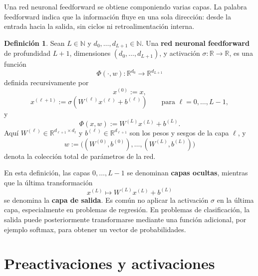 \documentclass[11pt]{report}
\newenvironment{tcolorbox}[1][]{\par\medskip\noindent\ignorespaces}{\par\medskip}
\theoremstyle{definition}
\newtheorem{definicion}{Definición}[section]
\theoremstyle{plain}
\numberwithin{equation}{section}
\begin{document}
Una red neuronal feedforward se obtiene componiendo varias capas. La palabra feedforward indica que la información fluye en una sola dirección: desde la entrada hacia la salida, sin ciclos ni retroalimentación interna.

\begin{tcolorbox}[colback=blue!8, colframe=blue!8, boxrule=0pt]
\begin{definicion}
Sean \(L\in\mathbb{N}\) y \(d_0,\ldots,d_{L+1}\in\mathbb{N}\). Una \textbf{red neuronal feedforward} de profundidad \(L+1\), dimensiones \((d_0,\ldots,d_{L+1})\), y activación \(\sigma:\mathbb{R}\to\mathbb{R}\), es una función
\begin{equation*}
    \Phi(\cdot,w):\mathbb{R}^{d_0}\to\mathbb{R}^{d_{L+1}}
\end{equation*}
definida recursivamente por
\begin{equation*}
    x^{(0)}:=x,
\end{equation*}
\begin{equation*}
    x^{(\ell+1)}
    :=
    \sigma(W^{(\ell)}x^{(\ell)}+b^{(\ell)})
    \qquad
    \text{para } \ell=0,\ldots,L-1,
\end{equation*}
y
\begin{equation*}
    \Phi(x,w)
    :=
    W^{(L)}x^{(L)}+b^{(L)}.
\end{equation*}
Aquí \(W^{(\ell)}\in\mathbb{R}^{d_{\ell+1}\times d_\ell}\) y \(b^{(\ell)}\in\mathbb{R}^{d_{\ell+1}}\) son los pesos y sesgos de la capa \(\ell\), y
\begin{equation*}
    w
    :=
    \bigl((W^{(0)},b^{(0)}),\ldots,(W^{(L)},b^{(L)})\bigr)
\end{equation*}
denota la colección total de parámetros de la red.
\end{definicion}
\end{tcolorbox}

En esta definición, las capas \(0,\ldots,L-1\) se denominan \textbf{capas ocultas}, mientras que la última transformación
\begin{equation*}
    x^{(L)}
    \mapsto
    W^{(L)}x^{(L)}+b^{(L)}
\end{equation*}
se denomina la \textbf{capa de salida}. Es común no aplicar la activación \(\sigma\) en la última capa, especialmente en problemas de regresión. En problemas de clasificación, la salida puede posteriormente transformarse mediante una función adicional, por ejemplo softmax, para obtener un vector de probabilidades.

\section{Preactivaciones y activaciones}
\end{document}
